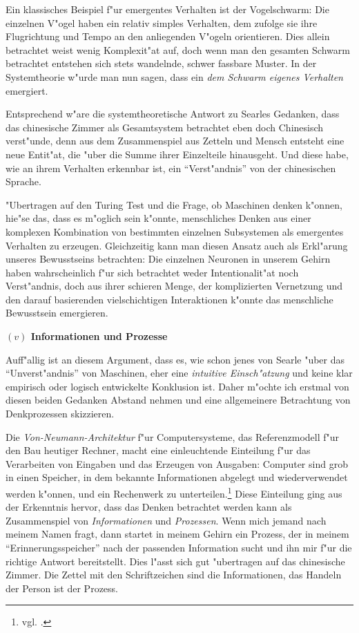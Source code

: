 \documentclass[a4paper, emulatestandardclasses, 12pt]{scrartcl}
\begin{document}
\begin{onehalfspace}
Ein klassisches Beispiel f"ur emergentes Verhalten ist der Vogelschwarm: Die einzelnen V"ogel haben ein relativ simples Verhalten, dem zufolge sie ihre Flugrichtung und Tempo an den anliegenden V"ogeln orientieren. Dies allein betrachtet weist wenig Komplexit"at auf, doch wenn man den gesamten Schwarm betrachtet entstehen sich stets wandelnde, schwer fassbare Muster. In der Systemtheorie w"urde man nun sagen, dass ein \emph{dem Schwarm eigenes Verhalten} emergiert.

Entsprechend w"are die systemtheoretische Antwort zu Searles Gedanken, dass das chinesische Zimmer als Gesamtsystem betrachtet eben doch Chinesisch verst"unde, denn aus dem Zusammenspiel aus Zetteln und Mensch entsteht eine neue Entit"at, die "uber die Summe ihrer Einzelteile hinausgeht. Und diese habe, wie an ihrem Verhalten erkennbar ist, ein "`Verst"andnis"' von der chinesischen Sprache.

"Ubertragen auf den Turing Test und die Frage, ob Maschinen denken k"onnen, hie"se das, dass es m"oglich sein k"onnte, menschliches Denken aus einer komplexen Kombination von bestimmten einzelnen Subsystemen als emergentes Verhalten zu erzeugen. Gleichzeitig kann man diesen Ansatz auch als Erkl"arung unseres Bewusstseins betrachten: Die einzelnen Neuronen in unserem Gehirn haben wahrscheinlich f"ur sich betrachtet weder Intentionalit"at noch Verst"andnis, doch aus ihrer schieren Menge, der komplizierten Vernetzung und den darauf basierenden vielschichtigen Interaktionen k"onnte das menschliche Bewusstsein emergieren.

\vspace{5mm}
\noindent\textbf{$(v)$ Informationen und Prozesse}

\noindent Auff"allig ist an diesem Argument, dass es, wie schon jenes von Searle "uber das "`Unverst"andnis"' von Maschinen, eher eine \emph{intuitive Einsch"atzung} und keine klar empirisch oder logisch entwickelte Konklusion ist. Daher m"ochte ich erstmal von diesen beiden Gedanken Abstand nehmen und eine allgemeinere Betrachtung von Denkprozessen skizzieren.

Die \emph{Von-Neumann-Architektur} f"ur Computersysteme, das Referenzmodell f"ur den Bau heutiger Rechner, macht eine einleuchtende Einteilung f"ur das Verarbeiten von Eingaben und das Erzeugen von Ausgaben: Computer sind grob in einen Speicher, in dem bekannte Informationen abgelegt und wiederverwendet werden k"onnen, und ein Rechenwerk zu unterteilen.\footnote{vgl. \cite{von1993first}.} Diese Einteilung ging aus der Erkenntnis hervor, dass das Denken betrachtet werden kann als Zusammenspiel von \emph{Informationen} und \emph{Prozessen}. Wenn mich jemand nach meinem Namen fragt, dann startet in meinem Gehirn ein Prozess, der in meinem "`Erinnerungsspeicher"' nach der passenden Information sucht und ihn mir f"ur die richtige Antwort bereitstellt. Dies l"asst sich gut "ubertragen auf das chinesische Zimmer. Die Zettel mit den Schriftzeichen sind die Informationen, das Handeln der Person ist der Prozess. 


\end{onehalfspace}
\end{document}
